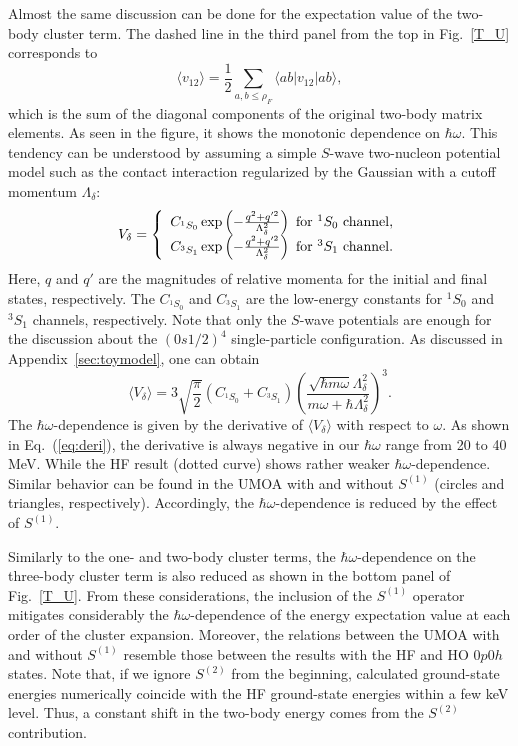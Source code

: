 \documentclass[aps,prc, dvips, twocolumn,groupedaddress,showkeys,showpacs,floatfix,superscriptaddress]{revtex4-1}
\newcommand{\<}{\langle}
\renewcommand{\>}{\rangle}
\begin{document}
Almost the same discussion can be done for the expectation value
 of the two-body cluster term.
The dashed line in the third panel from the top in Fig.~\ref{T_U} corresponds to
\begin{equation}
 \< v_{12} \> = \frac{1}{2}\sum_{a,b \le \rho_{F}}\<ab|v_{12}|ab\>,
\end{equation}
which is the sum of the diagonal components of the original two-body matrix elements.
As seen in the figure, it shows the monotonic dependence on $\hbar\omega$.
This tendency can be understood by assuming a simple $S$-wave two-nucleon potential model
 such as the contact interaction regularized by the Gaussian with a cutoff momentum $\Lambda_{\delta}$:
 \begin{equation}
   V_{\delta} = \left\{
     \begin{array}{c}
       C_{^{1}S_{0}} \exp\left( -
       \frac{q^{2} + q'^{2}}{\Lambda_{\delta}^{2}}
     \right) \ {\rm for} \ ^{1}S_{0}\ {\rm channel}, \\
     C_{^{3}S_{1}} \exp\left( -
     \frac{q^{2} + q'^{2}}{\Lambda_{\delta}^{2}}
   \right) \ {\rm for} \ ^{3}S_{1} \ {\rm channel}.
 \end{array}
 \right.
  \label{eq:gaus}
 \end{equation}
Here, $q$ and $q'$ are the magnitudes of relative momenta
 for the initial and final states, respectively.
The $C_{^{1}S_{0}}$ and $C_{^{3}S_{1}}$ are the low-energy constants for
 $^{1}S_{0}$ and $^{3}S_{1}$ channels, respectively.
Note that only the $S$-wave potentials are enough for the discussion about the $(0s1/2)^{4}$ single-particle configuration.
As discussed in Appendix~\ref{sec:toymodel}, one can obtain
\begin{equation}
  \<V_{\delta}\> = 3 \sqrt{\frac{\pi}{2}} (C_{^{1}S_{0}} + C_{^{3}S_{1}})
  \left(
    \frac{\sqrt{\hbar m\omega} \Lambda_{\delta}^{2}}
    {m\omega + \hbar\Lambda_{\delta}^{2}}
  \right)^{3}.
  \label{eq:vcnt}
\end{equation}
The $\hbar\omega$-dependence is given by the derivative of  $\<V_{\delta}\>$ with respect to $\omega$.
As shown in Eq.~(\ref{eq:deri}), the derivative is always negative
 in our $\hbar\omega$ range from 20 to 40 MeV.
While the HF result (dotted curve) shows rather weaker $\hbar\omega$-dependence.
Similar behavior can be found in the UMOA with and without $S^{(1)}$ (circles and triangles, respectively).
Accordingly, the $\hbar\omega$-dependence is reduced by the effect of $S^{(1)}$.

Similarly to the one- and two-body cluster terms, the $\hbar\omega$-dependence on
 the three-body cluster term is also reduced as shown in the bottom panel of Fig.~\ref{T_U}.
From these considerations, the inclusion of the $S^{(1)}$ operator
mitigates considerably the $\hbar\omega$-dependence of the energy expectation value
at each order of the cluster expansion.
Moreover, the relations between the UMOA with and without $S^{(1)}$
resemble those between the results with the HF and HO $0p0h$ states.
Note that, if we ignore $S^{(2)}$ from the beginning,
calculated ground-state energies numerically coincide with the HF ground-state energies within a few keV level.
Thus, a constant shift in the two-body energy comes from the $S^{(2)}$ contribution.
\end{document}
